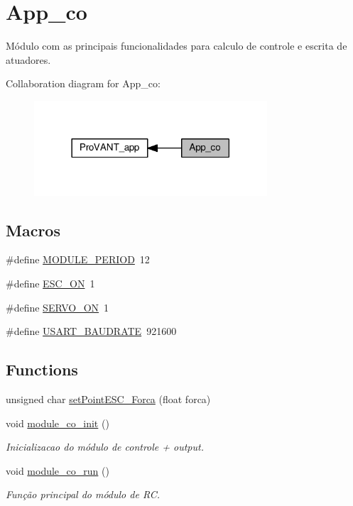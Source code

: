 \hypertarget{group__app__co}{}\section{App\+\_\+co}
\label{group__app__co}


Módulo com as principais funcionalidades para calculo de controle e escrita de atuadores.  


Collaboration diagram for App\+\_\+co\+:\nopagebreak
\begin{figure}[H]
\begin{center}
\leavevmode
\includegraphics[width=246pt]{group__app__co}
\end{center}
\end{figure}
\subsection*{Macros}
\begin{DoxyCompactItemize}
\item 
\#define \hyperlink{group__app__co_ga0ac6c9f2991b096e49c354e5cce6fae0}{M\+O\+D\+U\+L\+E\+\_\+\+P\+E\+R\+I\+OD}~12
\item 
\#define \hyperlink{group__app__co_gaec8246e954743c1eca3ed9d0b934bf8e}{E\+S\+C\+\_\+\+ON}~1
\item 
\#define \hyperlink{group__app__co_ga162e9e4abd94f1558733bbf17fca28e9}{S\+E\+R\+V\+O\+\_\+\+ON}~1
\item 
\#define \hyperlink{group__app__co_ga6a53a6c94a70cc286e300a0ea8f46ba4}{U\+S\+A\+R\+T\+\_\+\+B\+A\+U\+D\+R\+A\+TE}~921600
\end{DoxyCompactItemize}
\subsection*{Functions}
\begin{DoxyCompactItemize}
\item 
unsigned char \hyperlink{group__app__co_gac9b9b4433da08cf375a9089fbb464b74}{set\+Point\+E\+S\+C\+\_\+\+Forca} (float forca)
\item 
void \hyperlink{group__app__co_gabedb9a5c3739466a359c93b3585a3640}{module\+\_\+co\+\_\+init} ()
\begin{DoxyCompactList}\small\item\em Inicializacao do módulo de controle + output. \end{DoxyCompactList}\item 
void \hyperlink{group__app__co_gaab8216fc955d01b47e3431aae288d9d3}{module\+\_\+co\+\_\+run} ()
\begin{DoxyCompactList}\small\item\em Função principal do módulo de RC. \end{DoxyCompactList}\end{DoxyCompactItemize}

